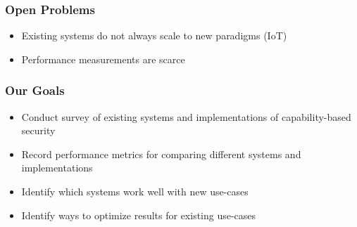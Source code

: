 \documentclass[xcolor=table]{beamer}
\begin{document}
\begin{frame}
  \frametitle{Open Problems}
    \begin{itemize}
        \item Existing systems do not always scale to new paradigms (IoT)
        \item Performance measurements are scarce 
    \end{itemize}
 
\end{frame}

\begin{frame}
  \frametitle{Our Goals}
   \begin{itemize}
      \item Conduct survey of existing systems and implementations of capability-based security
      \item Record performance metrics for comparing different systems and implementations
      \item Identify which systems work well with new use-cases
      \item Identify ways to optimize results for existing use-cases
      
      
  \end{itemize}
\end{frame}
\end{document}
